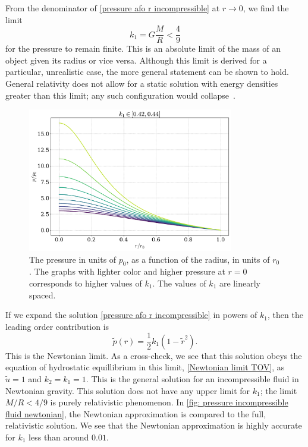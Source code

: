 From the denominator of \autoref{pressure afo r incompressible} at $r\rightarrow 0$, we find the limit
%
\begin{equation}
    \label{mass radius constraint}
    k_1 = G \frac{M}{R} < \frac{4}{9}
\end{equation}
%
for the pressure to remain finite.
This is an absolute limit of the mass of an object given its radius or vice versa.
Although this limit is derived for a particular, unrealistic case, the more general statement can be shown to hold.
General relativity does not allow for a static solution with energy densities greater than this limit; any such configuration would collapse~\autocite{carrollSpacetimeGeometryIntroduction2019}.


\begin{figure}[h]
    \centering
    \includegraphics[width=0.8\textwidth]{../scripts/figurer/incompressible.pdf}
    \caption{The pressure in units of $p_0$, as a function of the radius, in units of $r_0$. The graphs with lighter color and higher pressure at $r = 0$ corresponds to higher values of $k_1$. The values of $k_1$ are linearly spaced.}
    \label{fig: pressure incompressible fluid}
\end{figure}

 
If we expand the solution \autoref{pressure afo r incompressible} in powers of $k_1$, then the leading order contribution is
%
\begin{equation}
    \tilde p(r) = \frac{1}{2} k_1 (1 - \tilde r^2).
\end{equation}
%
This is the Newtonian limit.
As a cross-check, we see that this solution obeys the equation of hydrostatic equillibrium in this limit, \autoref{Newtonian limit TOV}, as $\tilde u = 1$ and $k_2 = k_1 = 1$.
This is the general solution for an incompressible fluid in Newtonian gravity.
This solution does not have any upper limit for $k_1$; the limit $M/R < 4 / 9$ is purely relativistic phenomenon.
In \autoref{fig: pressure incompressible fluid newtonian}, the Newtonian approximation is compared to the full, relativistic solution.
We see that the Newtonian approximation is highly accurate for $k_1$ less than around $0.01$.


